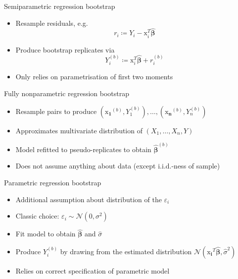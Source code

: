 \documentclass[tikz]{beamer}
\begin{document}
\begin{frame}{Semiparametric regression bootstrap}
    \begin{itemize}
        \item Resample residuals, e.g.
              \begin{equation*}
                  r_i \coloneqq Y_i - \bm{\mathrm{x}}^T_i \widehat{\bm{\beta}}
              \end{equation*}
        \item Produce bootstrap replicates via
              \begin{equation*}
                  Y_i^{(b)} \coloneqq \bm{\mathrm{x}}^T_i \widehat{\bm{\beta}} + r^{(b)}_i
              \end{equation*}
        \item Only relies on parametrisation of first two moments
    \end{itemize}
\end{frame}

\begin{frame}{Fully nonparametric regression bootstrap}
    \begin{itemize}
        \item Resample pairs to produce $(\bm{\mathrm{x}_1}^{(b)}, Y^{(b)}_1), \dots, (\bm{\mathrm{x}_n}^{(b)}, Y^{(b)}_n)$
        \item Approximates multivariate distribution of $(X_1, \dots, X_n, Y)$
        \item Model refitted to pseudo-replicates to obtain $\widehat{\bm{\beta}}^{(b)}$
        \item Does not assume anything about data (except i.i.d.-ness of sample)
    \end{itemize}
\end{frame}

\begin{frame}{Parametric regression bootstrap}
    \begin{itemize}
        \item Additional assumption about distribution of the $\varepsilon_i$
        \item Classic choice: $\varepsilon_i \sim \mathcal{N}(0, \sigma^2)$
        \item Fit model to obtain $\widehat{\bm{\beta}}$ and $\widehat{\sigma}$
        \item Produce $Y^{(b)}_i$ by drawing from the estimated distribution $\mathcal{N}(\bm{\mathrm{x}_i}^T \widehat{\bm{\beta}}, \widehat{\sigma}^2)$
        \item Relies on correct specification of parametric model
    \end{itemize}
\end{frame}
\end{document}
